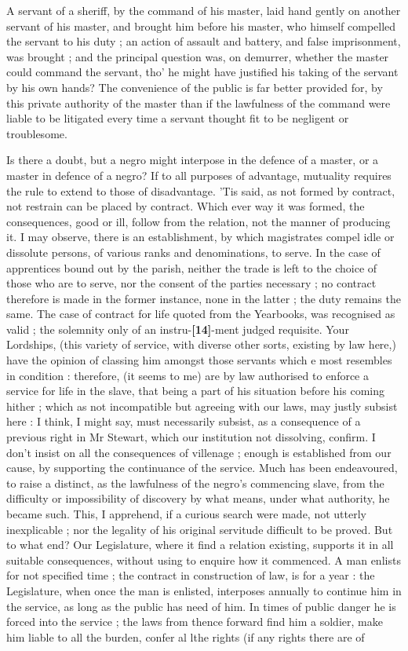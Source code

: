 \documentclass[a4paper]{article}
\begin{document}
A servant of a sheriff, by the command of his master, laid hand gently on another servant of his master, and brought him before his master, who himself compelled the servant to his duty ; an action of assault and battery, and false imprisonment, was brought ; and the principal question was, on demurrer, whether the master could  command the servant, tho' he might have justified his taking of the servant by his own hands? The convenience of the public is far better provided for, by this private authority of the master than if the lawfulness of the command were liable to be litigated every time a servant thought fit to be negligent or troublesome.

Is there a doubt, but a negro might interpose in the defence of a master, or a master in defence of a negro? If to all purposes of advantage, mutuality requires the rule to extend to those of disadvantage. 'Tis said, as not formed by contract, not restrain can be placed by contract. Which ever way it was formed, the consequences, good or ill, follow from the relation, not the manner of producing it. I may observe, there is an establishment, by which magistrates compel idle or dissolute persons, of various ranks and denominations, to serve. In the case of apprentices bound out by the parish, neither the trade is left to the choice of those who are to serve, nor the consent of the parties necessary ; no contract therefore is made in the former instance, none in the latter ; the duty remains the same. The case of contract for life quoted from the Yearbooks, was recognised as valid ; the solemnity only of an instru-\textbf{[14]}-ment judged requisite. Your Lordships, (this variety of service, with diverse other sorts, existing by law here,) have the opinion of classing him amongst those servants which e most resembles in condition : therefore, (it seems to me) are by law authorised to enforce a service for life in the slave, that being a part of his situation before his coming hither ; which as not incompatible but agreeing with our laws, may justly subsist here : I think, I might say, must necessarily subsist, as a consequence of a previous right in Mr Stewart, which our institution not dissolving, confirm. I don't insist on all the consequences of villenage ; enough is established from our cause, by supporting the continuance of the service. Much has been endeavoured, to raise a distinct, as the lawfulness of the negro's commencing slave, from the difficulty or impossibility of discovery by what means, under what authority, he became such. This, I apprehend, if a curious search were made, not utterly inexplicable ; nor the legality of his original servitude difficult to be proved. But to what end? Our Legislature, where it find a relation existing, supports it in all suitable consequences, without using to enquire how it commenced. A man enlists for not specified time ; the contract in construction of law, is for a year : the Legislature, when once the man is enlisted, interposes annually to continue him in the service, as long as the public has need of him. In times of public danger he is forced into the service ; the laws from thence forward find him a soldier, make him liable to all the burden, confer al lthe rights (if any rights there are of 
\end{document}
